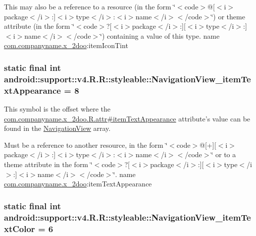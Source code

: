 This may also be a reference to a resource (in the form \char`\"{}$<$code$>$@\mbox{[}$<$i$>$package$<$/i$>$:\mbox{]}$<$i$>$type$<$/i$>$:$<$i$>$name$<$/i$>$$<$/code$>$\char`\"{}) or theme attribute (in the form \char`\"{}$<$code$>$?\mbox{[}$<$i$>$package$<$/i$>$:\mbox{]}\mbox{[}$<$i$>$type$<$/i$>$:\mbox{]}$<$i$>$name$<$/i$>$$<$/code$>$\char`\"{}) containing a value of this type.  name \hyperlink{namespacecom_1_1companyname_1_1x__2doo}{com.companyname.x\_\-2doo}:itemIconTint \hypertarget{classandroid_1_1support_1_1v4_1_1_r_1_1styleable_b1a0c348b812e885f19add02ede8941e}{
\subsubsection[{NavigationView\_\-itemTextAppearance}]{\setlength{\rightskip}{0pt plus 5cm}static final int android::support::v4.R.R::styleable::NavigationView\_\-itemTextAppearance = 8}}
\label{classandroid_1_1support_1_1v4_1_1_r_1_1styleable_b1a0c348b812e885f19add02ede8941e}


This symbol is the offset where the \hyperlink{classcom_1_1companyname_1_1x__2doo_1_1_r_1_1attr_66c7cc66e44a9ca1584b16305786e7aa}{com.companyname.x\_\-2doo.R.attr\#itemTextAppearance} attribute's value can be found in the \hyperlink{classandroid_1_1support_1_1v4_1_1_r_1_1styleable_5278cd545a73a5a4af313995900ae2d8}{NavigationView} array.

Must be a reference to another resource, in the form \char`\"{}$<$code$>$@\mbox{[}+\mbox{]}\mbox{[}$<$i$>$package$<$/i$>$:\mbox{]}$<$i$>$type$<$/i$>$:$<$i$>$name$<$/i$>$$<$/code$>$\char`\"{} or to a theme attribute in the form \char`\"{}$<$code$>$?\mbox{[}$<$i$>$package$<$/i$>$:\mbox{]}\mbox{[}$<$i$>$type$<$/i$>$:\mbox{]}$<$i$>$name$<$/i$>$$<$/code$>$\char`\"{}.  name \hyperlink{namespacecom_1_1companyname_1_1x__2doo}{com.companyname.x\_\-2doo}:itemTextAppearance \hypertarget{classandroid_1_1support_1_1v4_1_1_r_1_1styleable_a57c40afd9bad59379ce3cb367835803}{
\subsubsection[{NavigationView\_\-itemTextColor}]{\setlength{\rightskip}{0pt plus 5cm}static final int android::support::v4.R.R::styleable::NavigationView\_\-itemTextColor = 6}}
\label{classandroid_1_1support_1_1v4_1_1_r_1_1styleable_a57c40afd9bad59379ce3cb367835803}


